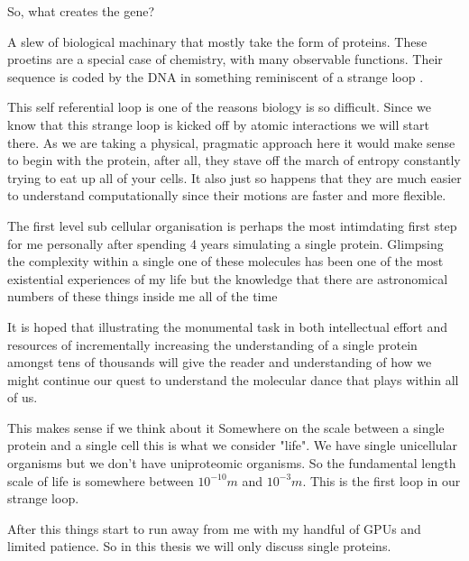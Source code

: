 So, what creates the gene? 

A slew of biological machinary that mostly take the form of proteins. These proetins are a special case of chemistry, with many observable functions. Their sequence is  coded by the DNA in something reminiscent of a strange loop \cite{hofstadter2007}. 

This self referential loop is one of the reasons biology is so difficult. Since we know that this strange loop is kicked off by atomic interactions we will start there. As we are taking a physical, pragmatic approach here it would make sense to begin with the protein, after all, they stave off the march of entropy constantly trying to eat up all of your cells. It also just so happens that they are much easier to understand computationally since their motions are faster and more flexible. 

The first level sub cellular organisation is perhaps the most intimdating first step for me personally after spending 4 years simulating a single protein. Glimpsing the complexity within a single one of these molecules has been one of the most existential experiences of my life but the knowledge that there are astronomical numbers of these things inside me all of the time 

It is hoped that illustrating the monumental task in both intellectual effort and resources of incrementally increasing the understanding of a single protein amongst tens of thousands will give the reader and understanding of how we might continue our quest to understand the molecular dance that plays within all of us.  
 
This makes sense if we think about it 
Somewhere on the scale between a single protein and a single cell this is what we consider "life". We have single unicellular organisms but we don't have uniproteomic organisms. So the fundamental length scale of life is somewhere between $10^{-10}m$ and $10^{-3}m$. This is the first loop in our strange loop.

After this things start to run away from me with my handful of GPUs and limited patience. So in this thesis we will only discuss single proteins.


